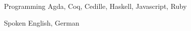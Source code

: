 

\begin{cvskills}

  \cvskill
    {Programming} %
    {Agda, Coq, Cedille, Haskell, Javascript, Ruby} %


  \cvskill
    {Spoken} %
    {English, German} %

\end{cvskills}
